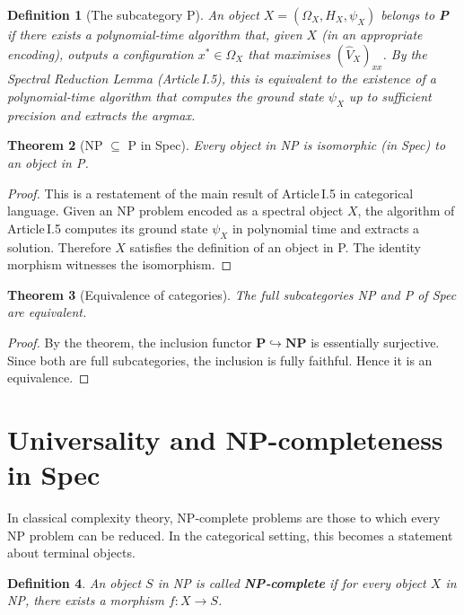 \documentclass[11pt,a4paper]{article}
\newtheorem{theorem}{Theorem}[section]
\newtheorem{definition}[theorem]{Definition}
\begin{document}
\begin{definition}[The subcategory P]
An object $X = (\Omega_X, H_X, \psi_X)$ belongs to \textbf{P} if there exists a polynomial‑time algorithm that, given $X$ (in an appropriate encoding), outputs a configuration $x^* \in \Omega_X$ that maximises $(\hat{V}_X)_{xx}$. By the Spectral Reduction Lemma (Article I.5), this is equivalent to the existence of a polynomial‑time algorithm that computes the ground state $\psi_X$ up to sufficient precision and extracts the argmax.
\end{definition}

\begin{theorem}[NP $\subseteq$ P in Spec]
Every object in NP is isomorphic (in Spec) to an object in P.
\end{theorem}
\begin{proof}
This is a restatement of the main result of Article I.5 in categorical language. Given an NP problem encoded as a spectral object $X$, the algorithm of Article I.5 computes its ground state $\psi_X$ in polynomial time and extracts a solution. Therefore $X$ satisfies the definition of an object in P. The identity morphism witnesses the isomorphism.
\end{proof}

\begin{theorem}[Equivalence of categories]
The full subcategories NP and P of Spec are equivalent.
\end{theorem}
\begin{proof}
By the theorem, the inclusion functor $\mathbf{P} \hookrightarrow \mathbf{NP}$ is essentially surjective. Since both are full subcategories, the inclusion is fully faithful. Hence it is an equivalence.
\end{proof}

\section{Universality and NP-completeness in Spec}

In classical complexity theory, NP‑complete problems are those to which every NP problem can be reduced. In the categorical setting, this becomes a statement about terminal objects.

\begin{definition}
An object $S$ in NP is called \textbf{NP‑complete} if for every object $X$ in NP, there exists a morphism $f: X \to S$.
\end{definition}
\end{document}
